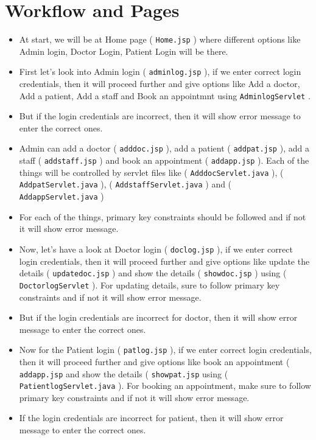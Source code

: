 \documentclass[12pt]{article}
\let\oldtexttt\texttt
\renewcommand{\texttt}[1]{
  \colorbox{bgcolor}{\oldtexttt{#1}}
  }
\begin{document}
\newpage
\section{Workflow and Pages}

\begin{itemize}
    \item At start, we will be at Home page (\texttt{Home.jsp}) where different options like Admin login, Doctor Login, Patient Login will be there.
    \item First let's look into Admin login (\texttt{adminlog.jsp}), if we enter correct login credentials, then it will proceed further and give options like Add a doctor, Add a patient, Add a staff and Book an appointmnt using \texttt{AdminlogServlet}.
    \item But if the login credentials are incorrect, then it will show error message to enter the correct ones.
    \item Admin can add a doctor (\texttt{adddoc.jsp}), add a patient (\texttt{addpat.jsp}), add a staff (\texttt{addstaff.jsp}) and book an appointment (\texttt{addapp.jsp}). Each of the things will be controlled by servlet files like (\texttt{AdddocServlet.java}), (\texttt{AddpatServlet.java}), (\texttt{AddstaffServlet.java}) and (\texttt{AddappServlet.java})
    \item For each of the things, primary key constraints should be followed and if not it will show error message.
    \item Now, let's have a look at Doctor login (\texttt{doclog.jsp}), if we enter correct login credentials, then it will proceed further and give options like update the details (\texttt{updatedoc.jsp}) and show the details (\texttt{showdoc.jsp}) using (\texttt{DoctorlogServlet}). For updating details, sure to follow primary key constraints and if not it will show error message.
    \item But if the login credentials are incorrect for doctor, then it will show error message to enter the correct ones.
    \item Now for the Patient login (\texttt{patlog.jsp}), if we enter correct login credentials, then it will proceed further and give options like book an appointment (\texttt{addapp.jsp} and show the details (\texttt{showpat.jsp} using (\texttt{PatientlogServlet.java}). For booking an appointment, make sure to follow primary key constraints and if not it will show error message.
    \item  If the login credentials are incorrect for patient, then it will show error message to enter the correct ones.
\end{itemize}
\newpage
\end{document}
